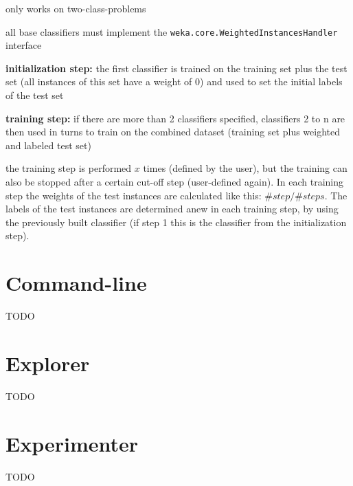\documentclass[a4paper]{book}
\begin{document}
\begin{tight_itemize}
	\item only works on two-class-problems
	\item all base classifiers must implement the 
	\texttt{weka.core.WeightedInstancesHandler} interface
	\item \textbf{initialization step:} the first classifier is trained on the 
	training set plus the test set (all instances of this set have a weight of 0) 
	and used to set the initial labels of the test set
	\item \textbf{training step:} if there are more than 2 classifiers specified, 
	classifiers 2 to n are then used in turns to train on the combined dataset 
	(training set plus weighted and labeled test set)
	\item the training step is performed $x$ times (defined by the user), but 
	the training can also be stopped after a certain cut-off step (user-defined 
	again). In each training step the weights of the test instances are 
	calculated like this: $\#step/\#steps$. The labels of the test instances 
	are determined anew in each training step, by using the previously built 
	classifier (if step 1 this is the classifier from the initialization step).
\end{tight_itemize}

\chapter{Command-line}
TODO

\chapter{Explorer}
TODO

\chapter{Experimenter}
TODO


\end{document}
